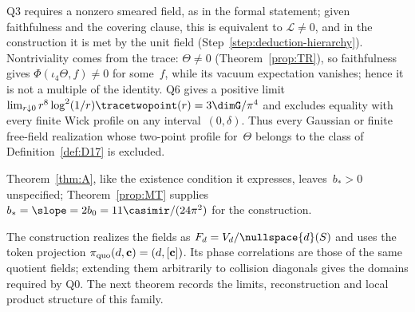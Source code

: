 \begin{remark}[Nontriviality]\label{rem:nontriviality}
Q3 requires a nonzero smeared field, as in the formal statement; given faithfulness and the covering clause, this is equivalent to $\mathcal L\ne0$, and in the construction it is met by the unit field (Step~\ref{step:deduction-hierarchy}). Nontriviality comes from the trace: $\Theta\ne0$ (Theorem~\ref{prop:TR}), so faithfulness gives $\Phi(\iota_4\Theta,f)\ne0$ for some~$f$, while its vacuum expectation vanishes; hence it is not a multiple of the identity. Q6 gives a positive limit $\lim_{r\downarrow0}r^8\log^2(1/r)\tracetwopoint(r)=3\dimG/\pi^4$ and excludes equality with every finite Wick profile on any interval~$(0,\delta)$. Thus every Gaussian or finite free-field realization whose two-point profile for~$\Theta$ belongs to the class of Definition~\ref{def:D17} is excluded.
\end{remark}

Theorem~\ref{thm:A}, like the existence condition it expresses, leaves~$b_*>0$ unspecified; Theorem~\ref{prop:MT} supplies $b_*=\slope=2b_0=11\casimir/(24\pi^2)$ for the construction.

The construction realizes the fields as $F_d=V_d/\nullspace{d}(S)$ and uses the token projection $\pi_{\rm quo}(d,\mathbf c)=(d,[\mathbf c])$. Its phase correlations are those of the same quotient fields; extending them arbitrarily to collision diagonals gives the domains required by Q0. The next theorem records the limits, reconstruction and local product structure of this family.

